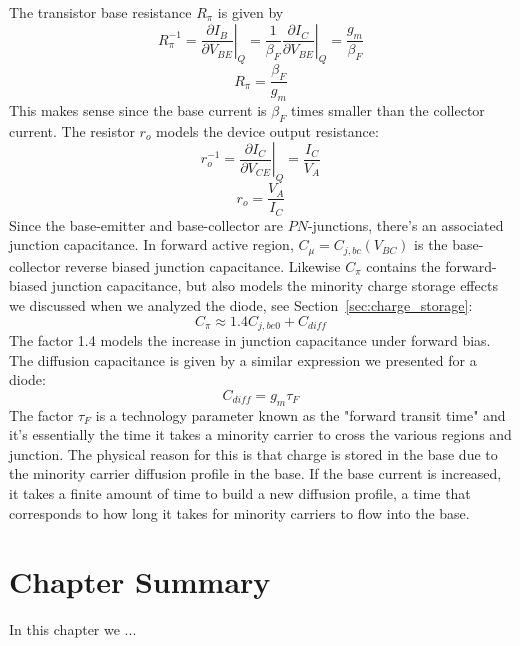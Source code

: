 The transistor base resistance $R_\pi$ is given by
    \begin{equation}
        R_\pi^{-1} = \left. \frac{\partial I_B}{\partial V_{BE}} \right|_Q = \frac{1}{\beta_F} \left. \frac{\partial I_C}{\partial V_{BE}}  \right|_Q = \frac{g_m}{\beta_F}
    \end{equation}
    \begin{equation}
        R_\pi = \frac{\beta_F}{g_m}
    \end{equation}
This makes sense since the base current is $\beta_F$ times smaller than the collector current.  The resistor $r_o$ models the device output resistance: 
    \begin{equation}
        r_o^{-1} = \left. \frac{\partial I_C}{\partial V_{CE}} \right|_Q  = \frac{I_C}{V_A}
    \end{equation}
    \begin{equation}
        r_o = \frac{V_A}{I_C}
    \end{equation}
Since the base-emitter and base-collector are $PN$-junctions, there's an associated junction capacitance.  In forward active region, $C_{\mu} = C_{j,bc}(V_{BC})$ is the base-collector reverse biased junction capacitance.  Likewise $C_\pi$ contains the forward-biased junction capacitance, but also models the minority charge storage effects we discussed when we analyzed the diode, see Section~\ref{sec:charge_storage}:
    \begin{equation}
        C_\pi \approx 1.4 C_{j,be0} + C_{diff}
    \end{equation}
The factor 1.4 models the increase in junction capacitance under forward bias.  The diffusion capacitance is given by a similar expression we presented for a diode:
    \begin{equation}
        C_{diff} = g_m \tau_F 
    \end{equation}
The factor $\tau_F$ is a technology parameter known as the "forward transit time" and it's essentially the time it takes a minority carrier to cross the various regions and junction.  The physical reason for this is that charge is stored in the base due to the minority carrier diffusion profile in the base.  If the base current is increased, it takes a finite amount of time to build a new diffusion profile, a time that corresponds to how long it takes for minority carriers to flow into the base.
\newpage
\section{Chapter Summary}
In this chapter we ...
